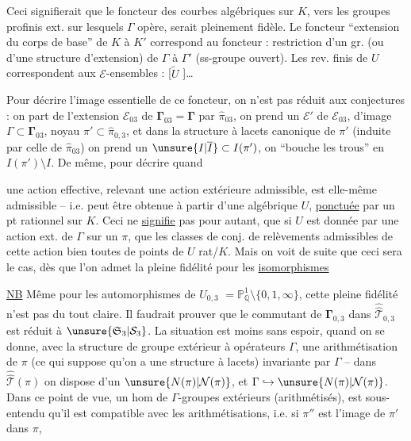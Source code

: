 Ceci signifierait que le foncteur des courbes
algébriques sur $K$, vers les groupes profinis ext.
sur lesquels $\Gamma$ opère, serait pleinement fidèle.
Le foncteur ``extension du corps de base'' de
$K$ à $K'$ correspond au foncteur : restriction
d'un gr.  (ou d'une structure
d'extension) de $\Gamma$ à $\Gamma'$ (ss-groupe ouvert).
Les rev.  finis de $U$ correspondent aux
$\mathcal E$-ensembles : [$\widetilde U$ ]\ldots

Pour décrire l'image essentielle de ce
foncteur, on n'est pas réduit aux conjectures :
on part de l'extension  $\mathcal E_{03}$ de $\boldsymbol{\Gamma}_{03}=\boldsymbol{\Gamma}$
par $\widehat{\pi}_{03}$, on prend un   $\mathcal E'$
de $\mathcal E_{03}$, d'image $\Gamma\subset\boldsymbol{\Gamma}_{03}$, noyau
$\pi'\subset\widehat{\pi}_{0,3}$, et dans la structure à lacets
canonique de $\pi'$ (induite par celle de $\widehat{\pi}_{03}$)
on prend un $\unsure{I|\overline I}\subset I(\pi')$,  on ``bouche les trous''
en $I(\pi')\setminus I$. De même, pour décrire quand

une action effective, relevant une action extérieure
admissible, est elle-même admissible -- 
i.e. peut être obtenue à partir d'une 
algébrique $U$, \uline{ponctuée} par un pt rationnel sur $K$.
Ceci ne \uline{signifie} pas pour autant, que si
$U$ est donnée par une action ext. de $\Gamma$ sur un $\pi$,
que les classes de conj. de relèvements admissibles
de cette action  bien toutes de
points de $U$ rat/$K$. Mais on voit de suite que
ceci sera le cas, dès que l'on admet la
pleine fidélité pour les \uline{isomorphismes}

\uline{NB} Même pour les automorphismes de $U_{0,3}$
$=\mathbb P^1_{\mathbb Q}\setminus\{0,1,\infty\}$, cette pleine fidélité n'est pas
du tout claire. Il faudrait prouver que 
le commutant de $\boldsymbol{\Gamma}_{0,3}$ dans $\widehat{\widehat{\mathcal T}}_{0,3}$ est réduit
à $\unsure{\mathfrak S_3|\mathcal S_3}$. La situation est moins sans espoir,
quand on se donne, avec la structure de
groupe  extérieur à opérateurs $\Gamma$, une arithmétisation
de $\pi$ (ce qui suppose qu'on a 
une structure à lacets) invariante par  $\Gamma$
--  dans $\widehat{\widehat{\mathcal T}}(\pi)$ on dispose d'un $\unsure{N(\pi)|\mathcal N(\pi)}$,
et $\Gamma\hookrightarrow\unsure{N(\pi)|\mathcal N(\pi)}$. Dans ce point de vue,  un
hom  de $\Gamma$-groupes extérieurs (arithmétisés),
 est sous-entendu qu'il est compatible avec
les arithmétisations, i.e. si $\pi''$ est l'image de $\pi'$ dans $\pi$,

